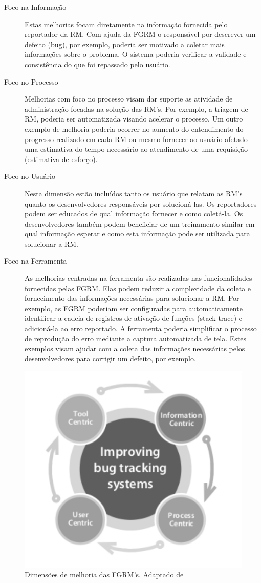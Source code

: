 \begin{description}
	\item[Foco na Informação] Estas melhorias focam diretamente na informação
		fornecida pelo reportador da RM\@. Com ajuda da FGRM o responsável por
		descrever um defeito (bug), por exemplo, poderia ser motivado a coletar mais
		informações sobre o problema. O sistema poderia verificar a validade e
		consistência do que foi repassado pelo usuário.
	\item[Foco no Processo] Melhorias com foco no processo visam dar suporte as
		atividade de administração focadas na solução das RM's. Por exemplo, a
		triagem de RM, poderia ser automatizada visando acelerar o processo. Um
		outro exemplo de melhoria poderia ocorrer no aumento do entendimento do
		progresso realizado em cada RM ou mesmo fornecer ao usuário afetado uma
		estimativa do tempo necessário ao atendimento de uma requisição
		(estimativa de esforço).
	\item[Foco no Usuário] Nesta dimensão estão incluídos tanto os usuário que
		relatam as RM's quanto os desenvolvedores responsáveis por
		solucioná-las.  Os reportadores podem ser educados de qual informação
		fornecer e como coletá-la. Os desenvolvedores também podem beneficiar de
		um treinamento similar em qual informação esperar e como esta informação
		pode ser utilizada para solucionar a RM\@.
	\item[Foco na Ferramenta] As melhorias centradas na ferramenta são
		realizadas nas funcionalidades fornecidas pelas FGRM\@. Elas podem
		reduzir a complexidade da coleta e fornecimento das informações
		necessárias para solucionar a RM\@. Por exemplo, as FGRM poderiam ser
		configuradas para automaticamente identificar a cadeia de registros de
		ativação de funções (stack trace) e adicioná-la ao erro reportado. A
		ferramenta poderia simplificar o processo de reprodução do erro mediante
		a captura automatizada de tela. Estes exemplos visam
		ajudar com a coleta das informações necessárias pelos desenvolvedores
		para corrigir um defeito, por exemplo.
\end{description}

\begin{figure}[htpb] \centering
	\includegraphics[width=0.666666\linewidth]
	{chapter-intro/img/dimensoes_melhorias_fgrm.pdf}
	\caption{Dimensões de melhoria das FGRM's. Adaptado
		de~\cite{zimmermann2005mining}}\label{fig:dimensoes_melhorias_fgrm}
\end{figure}

